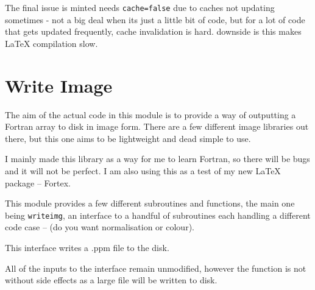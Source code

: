 \documentclass[a4paper]{article}
\begin{document}
The final issue is minted needs \texttt{cache=false} due to caches not updating sometimes - not a big deal when its just a little bit of code, but for a lot of code that gets updated frequently, cache invalidation is hard. downside is this makes \LaTeX{} compilation slow.

\section{Write Image}
\label{sec:writeimg}

The aim of the actual code in this module is to provide a way of outputting a Fortran array to disk in image form. There are a few different image libraries out there, but this one aims to be lightweight and dead simple to use. 

I mainly made this library as a way for me to learn Fortran, so there will be bugs and it will not be perfect. I am also using this as a test of my new \LaTeX{} package -- Fortex.

This module provides a few different subroutines and functions, the main one being \texttt{writeimg}, an interface to a handful of subroutines each handling a different code case -- (do you want normalisation or colour). 

This interface writes a .ppm file to the disk.

All of the inputs to the interface remain unmodified, however the function is not without side effects as a large file will be written to disk.
\end{document}
